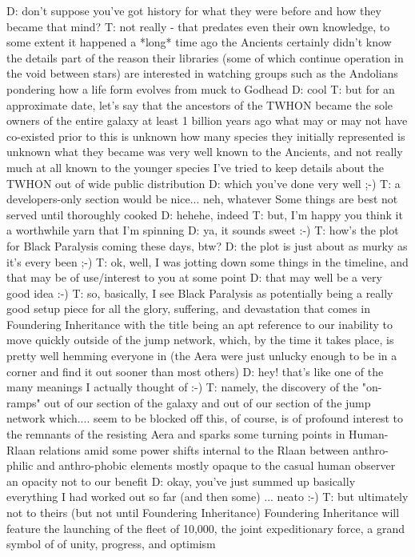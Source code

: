 D: don't suppose you've got history for what they were before and how they became that mind?
T: not really - that predates even their own knowledge, to some extent
it happened a *long* time ago
the Ancients certainly didn't know the details
part of the reason their libraries (some of which continue operation in the void between stars) are interested in watching groups such as the Andolians
pondering how a life form evolves from muck to Godhead
D: cool
T: but for an approximate date, let's say that the ancestors of the TWHON became the sole owners of the entire galaxy at least 1 billion years ago
what may or may not have co-existed prior to this is unknown
how many species they initially represented is unknown
what they became was very well known to the Ancients, and not really much at all known to the younger species
I've tried to keep details about the TWHON out of wide public distribution
D: which you've done very well ;-)
T: a developers-only section would be nice... neh, whatever
Some things are best not served until thoroughly cooked
D: hehehe, indeed
T: but, I'm happy you think it a worthwhile yarn that I'm spinning
D: ya, it sounds sweet :-)
T: how's the plot for Black Paralysis coming these days, btw?
D: the plot is just about as murky as it's every been ;-)
T: ok, well, I was jotting down some things in the timeline, and that may be of use/interest to you at some point
D: that may well be a very good idea :-)
T: so, basically, I see Black Paralysis as potentially being a really good setup piece for all the glory, suffering, and devastation that comes in Foundering Inheritance
with the title being an apt reference to our inability to move quickly outside of the jump network, which, by the time it takes place, is pretty well hemming everyone in (the Aera were just unlucky enough to be in a corner and find it out sooner than most others)
D: hey! that's like one of the many meanings I actually thought of :-)
T: namely, the discovery of the "on-ramps" out of our section of the galaxy
and out of our section of the jump network
which.... seem to be blocked off
this, of course, is of profound interest to the remnants of the resisting Aera
and sparks some turning points in Human-Rlaan relations
amid some power shifts internal to the Rlaan between anthro-philic and anthro-phobic elements
mostly opaque to the casual human observer
an opacity not to our benefit
D: okay, you've just summed up basically everything I had worked out so far (and then some) ... neato :-)
T: but ultimately not to theirs (but not until Foundering Inheritance)
Foundering Inheritance will feature the launching of the fleet of 10,000, the joint expeditionary force, a grand symbol of of unity, progress, and optimism 
